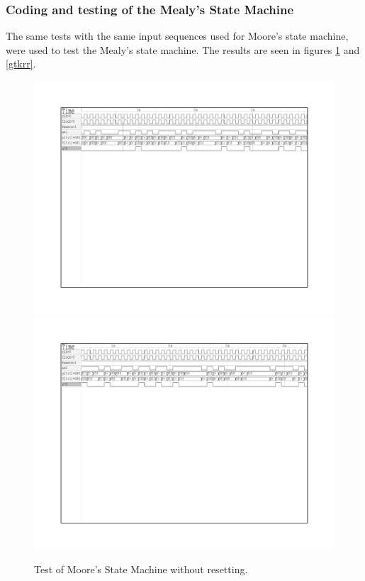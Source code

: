 \subsubsection{\color{orange}Coding and testing of the Mealy's State Machine}
The same tests with the same input sequences used for Moore's state machine, were used to test the Mealy's state machine. The results are seen in figures \ref{gtkk} and \ref{gtkrr}.


\begin{figure}[H]
\centering
\includegraphics[scale=0.9]{../Exercise2/Mealy/gtk00}
\includegraphics[scale=0.9]{../Exercise2/Mealy/gtk}
\caption{\color{cyan}Test of Moore's State Machine without resetting.}
\label{gtkk}
\end{figure}


